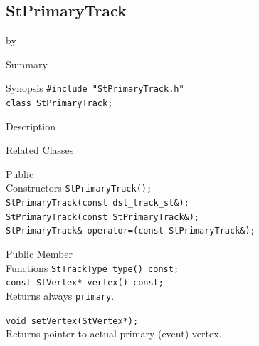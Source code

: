 \documentclass[twoside]{article}
\newcommand{\entrylabel}[1]{\mbox{\textbf{{#1}}}\hfil}%
\newenvironment{entry}
{\begin{list}{}%
    {\renewcommand{\makelabel}{\entrylabel}%
     \setlength{\labelwidth}{90pt}%
     \setlength{\leftmargin}{\labelwidth}
     \advance\leftmargin by \labelsep%
      }%
    }%
  {\end{list}}
\newcommand{\Entrylabel}[1]%
{\raisebox{0pt}[1ex][0pt]{\makebox[\labelwidth][l]%
    {\parbox[t]{\labelwidth}{\hspace{0pt}\textbf{{#1}}}}}}
\newenvironment{Entry}%
{\renewcommand{\entrylabel}{\Entrylabel}\begin{entry}}%
  {\end{entry}}
\begin{document}
\subsection{StPrimaryTrack}
\label{sec:StPrimaryTrack}
\begin{Entry}
\item[Summary]
\item[Synopsis]
    \verb+#include "StPrimaryTrack.h"+\\
    \verb+class StPrimaryTrack;+\\
\item[Description]
\item[Related Classes]
\item[Public\\ Constructors]
    \verb+StPrimaryTrack();+\\
    \verb+StPrimaryTrack(const dst_track_st&);+\\
    \verb+StPrimaryTrack(const StPrimaryTrack&);+\\
    \verb+StPrimaryTrack& operator=(const StPrimaryTrack&);+\\
\item[Public Member\\ Functions]
    \verb+StTrackType type() const;+\\
    \verb+const StVertex* vertex() const;+\\
    Returns always \texttt{primary}.

    \verb+void setVertex(StVertex*);+\\
    Returns pointer to actual primary (event) vertex.
\end{Entry}
\clearpage
\end{document}
